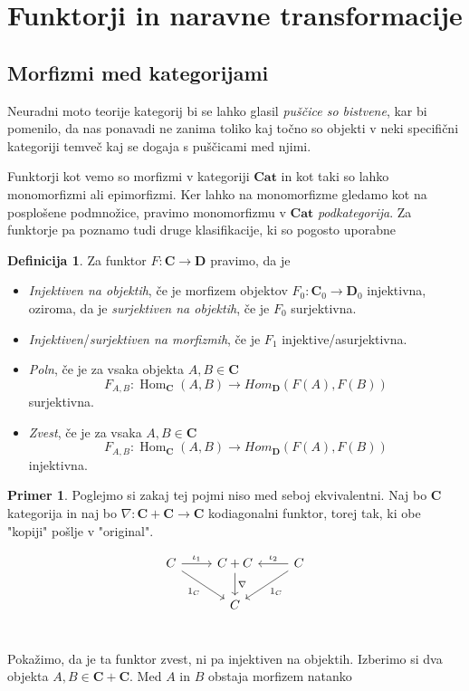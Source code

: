 \documentclass[12pt,a4paper]{book}
\theoremstyle{definition}
\newtheorem{definicija}{Definicija}[chapter]
\theoremstyle{plain}
\theoremstyle{definition}
\newtheorem{primer}{Primer}[section]
\theoremstyle{remark}
\newcommand{\cat}[1]{\textbf{#1}}
\DeclareMathOperator{\Hom}{Hom}
\begin{document}
\section{Funktorji in naravne transformacije}

\subsection{Morfizmi med kategorijami}

Neuradni moto teorije kategorij bi se lahko glasil \textit{puščice so bistvene},
kar bi pomenilo, da nas ponavadi ne zanima toliko kaj točno so objekti v neki specifični kategoriji temveč kaj se dogaja s puščicami med njimi.

Funktorji kot vemo so morfizmi v kategoriji $\cat{Cat}$ in kot taki so lahko monomorfizmi ali epimorfizmi. Ker lahko na monomorfizme gledamo kot na posplošene podmnožice, pravimo monomorfizmu v $\cat{Cat}$ \emph{podkategorija}. Za funktorje pa poznamo tudi druge klasifikacije, ki so pogosto uporabne

\begin{definicija}
Za funktor $F : \cat{C} \to \cat{D}$ pravimo, da je 
\begin{itemize}
\item \emph{Injektiven na objektih}, če je morfizem objektov $F_0 : \cat{C}_0 \to \cat{D}_0$ injektivna, oziroma, da je \emph{surjektiven na objektih}, če je $F_0$ surjektivna.
\item \emph{Injektiven}/\emph{surjektiven na morfizmih}, če je $F_1$ injektive/asurjektivna.
\item \emph{Poln}, če je za vsaka objekta $A,B \in \cat{C}$
$$F_{A,B} : \Hom_{\cat{C}}(A,B) \to Hom_{\cat{D}}(F(A),F(B))$$
surjektivna.
\item \emph{Zvest}, če je za vsaka $A,B \in \cat{C}$
$$F_{A,B} : \Hom_{\cat{C}}(A,B) \to Hom_{\cat{D}}(F(A),F(B))$$
injektivna.
\end{itemize}
\end{definicija}

\begin{primer}
Poglejmo si zakaj tej pojmi niso med seboj ekvivalentni. Naj bo $\cat{C}$ kategorija in naj bo $\nabla : \cat{C} + \cat{C} \to \cat{C}$ kodiagonalni funktor, torej tak, ki obe "kopiji" pošlje v "original".

$$\begin{tikzcd}[column sep=normal]
C \ar[r, "\iota_1"] \ar[dr, "1_C"'] & C + C \ar[d, "\nabla"] & C \ar[l, "\iota_2"'] \ar[dl, "1_C"] \\
& C & \\
\end{tikzcd}$$

Pokažimo, da je ta funktor zvest, ni pa injektiven na objektih. Izberimo si dva objekta $A,B \in \cat{C} + \cat{C}$. Med $A$ in $B$ obstaja morfizem natanko 

\end{primer}
\end{document}
